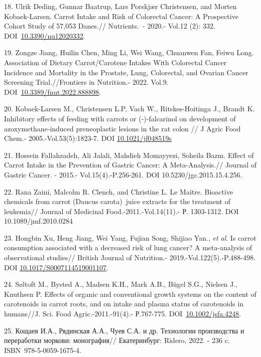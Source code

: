 \begin{refs}
18. Ulrik Deding, Gunnar Baatrup, Lars Porskjær Christensen, and Morten
Kobaek-Larsen. Carrot Intake and Risk of Colorectal Cancer: A
Prospective Cohort Study of 57,053 Danes.// Nutrients.~- 2020.-
Vol.12 (2): 332.
DOI~\href{https://doi.org/10.3390/nu12020332}{10.3390/nu12020332}.

19. Zongze Jiang, Huilin Chen, Ming Li, Wei Wang, Chuanwen Fan, Feiwu
Long. Association of Dietary Carrot/Carotene Intakes With Colorectal
Cancer Incidence and Mortality in the Prostate, Lung, Colorectal, and
Ovarian Cancer Screening Trial.//Frontiers in Nutrition.- 2022. Vol.9.
DOI~\href{https://doi.org/10.3389/fnut.2022.888898}{10.3389/fnut.2022.888898}.

20. Kobaek-Larsen M., Christensen L.P, Vach W., Ritskes-Hoitinga J.,
Brandt K. Inhibitory effects of feeding with carrots or (-)-falcarinol
on development of azoxymethane-induced preneoplastic lesions in the rat
colon // J Agric Food Chem.- 2005.-Vol.53(5):1823-7. DOI
\href{https://doi.org/10.1021/jf048519s}{10.1021/jf048519s}

21. Hossein Fallahzadeh, Ali Jalali, Mahdieh Momayyezi, Soheila Bazm.
Effect of Carrot Intake in the Prevention of Gastric Cancer: A
Meta-Analysis.// Journal of Gastric Cancer. - 2015.-
Vol.15(4).-P.256-261. DOI 10.5230/jgc.2015.15.4.256.

22. Rana Zaini, Malcolm R. Clench, and Christine L. Le Maitre. Bioactive
chemicals from carrot (Daucus carota)~juice extracts for the treatment
of leukemia// Journal of Medicinal Food.-2011.-Vol.14(11).- Р.
1303-1312. DOI 10.1089/jmf.2010.0284

23. Hongbin Xu, Heng Jiang, Wei Yang, Fujian Song, Shijiao Yan.,
\emph{et al}. Is carrot consumption associated with a decreased risk of
lung cancer? A meta-analysis of observational studies// British Journal
of Nutrition.- 2019.-Vol.122(5).-P.488-498. DOI
\href{https://doi.org/10.1017/s0007114519001107}{10.1017/S0007114519001107}.

24. Søltoft M., Bysted A., Madsen K.H., Mark A.B., Bügel S.G., Nielsen
J., Knuthsen P. Effects of organic and conventional growth systems on
the content of carotenoids in carrot roots, and on intake and plasma
status of carotenoids in humans//J. Sci. Food Agric.-2011.-91(4).-
Р.767-775.
DOI~\href{https://doi.org/10.1002/jsfa.4248}{10.1002/jsfa.4248}.

25. Кощаев И.А., Рядинская А.А., Чуев С.А. и др. Технологии производства
и переработки моркови: монография// Екатеринбург: Ridero, 2022. - 236 c.
ISBN~978-5-0059-1675-4.


\end{refs}
